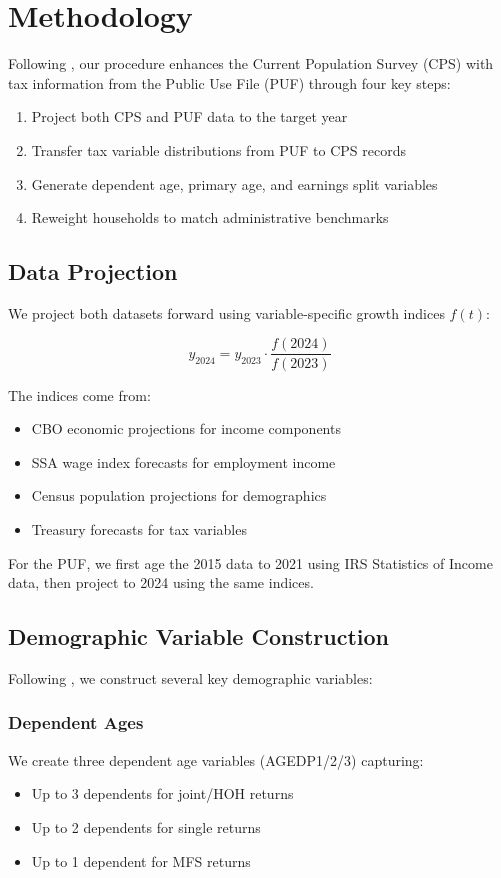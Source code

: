 \section{Methodology}\label{sec:methodology}

Following \cite{bryant2022}, our procedure enhances the Current Population Survey (CPS) with tax information from the Public Use File (PUF) through four key steps:
\begin{enumerate}
    \item Project both CPS and PUF data to the target year
    \item Transfer tax variable distributions from PUF to CPS records
    \item Generate dependent age, primary age, and earnings split variables
    \item Reweight households to match administrative benchmarks
\end{enumerate}

\subsection{Data Projection}

We project both datasets forward using variable-specific growth indices $f(t)$:

\[ y_{2024} = y_{2023} \cdot \frac{f(2024)}{f(2023)} \]

The indices come from:
\begin{itemize}
    \item CBO economic projections for income components
    \item SSA wage index forecasts for employment income
    \item Census population projections for demographics
    \item Treasury forecasts for tax variables
\end{itemize}

For the PUF, we first age the 2015 data to 2021 using IRS Statistics of Income data, then project to 2024 using the same indices.

\subsection{Demographic Variable Construction}

Following \cite{bryant2022}, we construct several key demographic variables:

\subsubsection{Dependent Ages}
We create three dependent age variables (AGEDP1/2/3) capturing:
\begin{itemize}
    \item Up to 3 dependents for joint/HOH returns
    \item Up to 2 dependents for single returns 
    \item Up to 1 dependent for MFS returns
\end{itemize}

